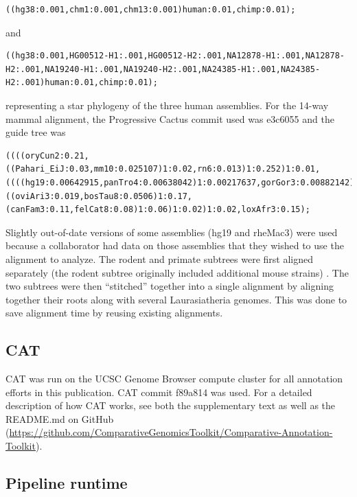 \documentclass[fleqn,10pt]{wlscirep}
\begin{document}
\begin{lstlisting}
((hg38:0.001,chm1:0.001,chm13:0.001)human:0.01,chimp:0.01);
\end{lstlisting}

and

\begin{lstlisting}
((hg38:0.001,HG00512-H1:.001,HG00512-H2:.001,NA12878-H1:.001,NA12878-H2:.001,NA19240-H1:.001,NA19240-H2:.001,NA24385-H1:.001,NA24385-H2:.001)human:0.01,chimp:0.01);
\end{lstlisting}
  
representing a star phylogeny of the three human assemblies. For the 14-way mammal alignment, the Progressive Cactus commit used was e3c6055 and the guide tree was 
  
\begin{lstlisting}
((((oryCun2:0.21,((Pahari_EiJ:0.03,mm10:0.025107)1:0.02,rn6:0.013)1:0.252)1:0.01,((((hg19:0.00642915,panTro4:0.00638042)1:0.00217637,gorGor3:0.00882142)1:0.00935116,ponAbe2:0.0185056)1:0.00440069,rheMac3:0.007)1:0.1)1:0.02,((oviAri3:0.019,bosTau8:0.0506)1:0.17,(canFam3:0.11,felCat8:0.08)1:0.06)1:0.02)1:0.02,loxAfr3:0.15);
\end{lstlisting}

Slightly out-of-date versions of some assemblies (hg19 and rheMac3) were used because a collaborator had data on those assemblies that they wished to use the alignment to analyze. The rodent and primate subtrees were first aligned separately (the rodent subtree originally included additional mouse strains) \citep{thybert2018repeat,lilue2018multiple}. The two subtrees were then “stitched” together into a single alignment by aligning together their roots along with several Laurasiatheria genomes. This was done to save alignment time by reusing existing alignments.

\subsection*{CAT}

CAT was run on the UCSC Genome Browser compute cluster for all annotation efforts in this publication. CAT commit f89a814 was used. For a detailed description of how CAT works, see both the supplementary text as well as the README.md on GitHub (\url{https://github.com/ComparativeGenomicsToolkit/Comparative-Annotation-Toolkit}). 

\subsection*{Pipeline runtime}
\end{document}
